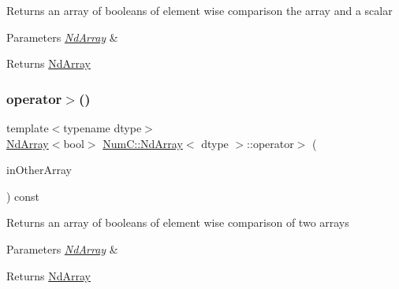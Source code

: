 Returns an array of booleans of element wise comparison the array and a scalar


\begin{DoxyParams}{Parameters}
{\em \mbox{\hyperlink{class_num_c_1_1_nd_array}{Nd\+Array}}} & \\
\hline
\end{DoxyParams}
\begin{DoxyReturn}{Returns}
\mbox{\hyperlink{class_num_c_1_1_nd_array}{Nd\+Array}} 
\end{DoxyReturn}
\mbox{\label{class_num_c_1_1_nd_array_a9689867e06e8eaadd14e5894aa9c0314}} 
\subsubsection{\texorpdfstring{operator$>$()}{operator>()}\hspace{0.1cm}{\footnotesize\ttfamily [2/2]}}
{\footnotesize\ttfamily template$<$typename dtype$>$ \\
\mbox{\hyperlink{class_num_c_1_1_nd_array}{Nd\+Array}}$<$bool$>$ \mbox{\hyperlink{class_num_c_1_1_nd_array}{Num\+C\+::\+Nd\+Array}}$<$ dtype $>$\+::operator$>$ (\begin{DoxyParamCaption}\item[{const \mbox{\hyperlink{class_num_c_1_1_nd_array}{Nd\+Array}}$<$ dtype $>$ \&}]{in\+Other\+Array }\end{DoxyParamCaption}) const\hspace{0.3cm}{\ttfamily [inline]}}

Returns an array of booleans of element wise comparison of two arrays


\begin{DoxyParams}{Parameters}
{\em \mbox{\hyperlink{class_num_c_1_1_nd_array}{Nd\+Array}}} & \\
\hline
\end{DoxyParams}
\begin{DoxyReturn}{Returns}
\mbox{\hyperlink{class_num_c_1_1_nd_array}{Nd\+Array}} 
\end{DoxyReturn}
\mbox{\label{class_num_c_1_1_nd_array_a0d67e0665db97abe686599cb0a9d0196}} 
